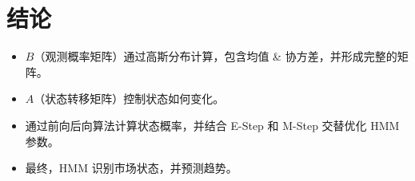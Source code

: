 \documentclass{article}
\begin{document}
\section{结论}

\begin{itemize}
    \item $B$（观测概率矩阵）通过高斯分布计算，包含均值 \& 协方差，并形成完整的矩阵。
    \item $A$（状态转移矩阵）控制状态如何变化。
    \item 通过前向后向算法计算状态概率，并结合 E-Step 和 M-Step 交替优化 HMM 参数。
    \item 最终，HMM 识别市场状态，并预测趋势。
\end{itemize}
\end{document}
